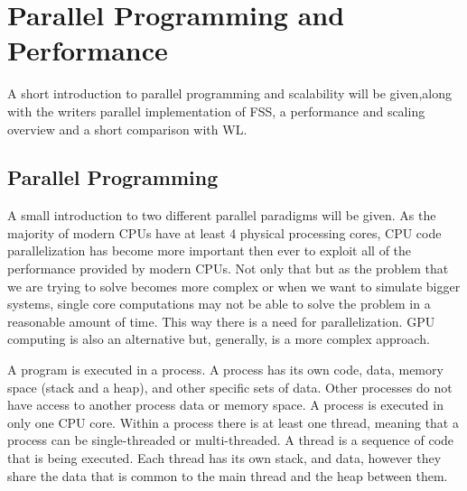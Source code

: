 \chapter{Parallel Programming and Performance}

	A short introduction to parallel programming and scalability will be given,along with the writers parallel implementation of FSS, a performance and scaling overview and a short comparison with WL.

\section{Parallel Programming}

		A small introduction to two different parallel paradigms will be given. As the majority of modern CPUs have at least 4 physical processing cores, CPU code parallelization has become more important then ever to exploit all of the performance provided by modern CPUs. Not only that but as the problem that we are trying to solve becomes more complex or when we want to simulate bigger systems, single core computations may not be able to solve the problem in a reasonable amount of time. This way there is a need for parallelization. GPU computing is also an alternative but, generally, is a more complex approach.

	A program is executed in a process. A process has its own code, data, memory space (stack and a heap), and other specific sets of data. Other processes do not have access to another process data or memory space. A process is executed in only one CPU core. Within a process there is at least one thread, meaning that a process can be single-threaded or multi-threaded. A thread is a sequence of code that is being executed. Each thread has its own stack, and data, however they share the data that is common to the main thread and the heap between them.

